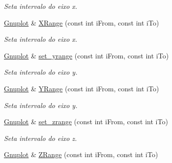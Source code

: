 \begin{DoxyCompactItemize}
\begin{DoxyCompactList}\small\item\em Seta intervalo do eixo x. \end{DoxyCompactList}\item 
\hypertarget{classGnuplot_a3fb5c7726e954739d847edd2670705fe}{\hyperlink{classGnuplot}{Gnuplot} \& \hyperlink{classGnuplot_a3fb5c7726e954739d847edd2670705fe}{X\-Range} (const int i\-From, const int i\-To)}\label{classGnuplot_a3fb5c7726e954739d847edd2670705fe}

\begin{DoxyCompactList}\small\item\em Seta intervalo do eixo x. \end{DoxyCompactList}\item 
\hypertarget{classGnuplot_af621a43664a07523f098ffc3fb5a99b0}{\hyperlink{classGnuplot}{Gnuplot} \& \hyperlink{classGnuplot_af621a43664a07523f098ffc3fb5a99b0}{set\-\_\-yrange} (const int i\-From, const int i\-To)}\label{classGnuplot_af621a43664a07523f098ffc3fb5a99b0}

\begin{DoxyCompactList}\small\item\em Seta intervalo do eixo y. \end{DoxyCompactList}\item 
\hypertarget{classGnuplot_a266411505d17e3f85ceebd252b9e5fe9}{\hyperlink{classGnuplot}{Gnuplot} \& \hyperlink{classGnuplot_a266411505d17e3f85ceebd252b9e5fe9}{Y\-Range} (const int i\-From, const int i\-To)}\label{classGnuplot_a266411505d17e3f85ceebd252b9e5fe9}

\begin{DoxyCompactList}\small\item\em Seta intervalo do eixo y. \end{DoxyCompactList}\item 
\hypertarget{classGnuplot_a91666451b8cfd1c5b279d2e585b11af6}{\hyperlink{classGnuplot}{Gnuplot} \& \hyperlink{classGnuplot_a91666451b8cfd1c5b279d2e585b11af6}{set\-\_\-zrange} (const int i\-From, const int i\-To)}\label{classGnuplot_a91666451b8cfd1c5b279d2e585b11af6}

\begin{DoxyCompactList}\small\item\em Seta intervalo do eixo z. \end{DoxyCompactList}\item 
\hypertarget{classGnuplot_a8331c7ee5d65be5f4d88922a0b2f5d35}{\hyperlink{classGnuplot}{Gnuplot} \& \hyperlink{classGnuplot_a8331c7ee5d65be5f4d88922a0b2f5d35}{Z\-Range} (const int i\-From, const int i\-To)}\label{classGnuplot_a8331c7ee5d65be5f4d88922a0b2f5d35}


\end{DoxyCompactItemize}
